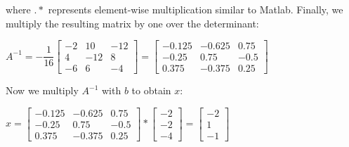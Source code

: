 \documentclass{article}
\newcommand{\1}{\mathbf{1}}
\begin{document}
\begin{enumerate}
\begin{center}
	\end{center}
	where $.*$ represents element-wise multiplication similar to Matlab. Finally, we multiply the resulting matrix by one over the determinant:
	\begin{center}
		$A^{-1}=- \dfrac{1}{16}\begin{bmatrix}-2&10&-12 \\ 4&-12&8 \\ -6&6&-4 \end{bmatrix}= \begin{bmatrix}-0.125&-0.625&0.75 \\ -0.25&0.75&-0.5 \\ 0.375&-0.375&0.25 \end{bmatrix}$
	\end{center}
	Now we multiply $A^{-1}$ with $b$ to obtain $x$:
	\begin{center}
		$x=\begin{bmatrix}-0.125&-0.625&0.75 \\ -0.25&0.75&-0.5 \\ 0.375&-0.375&0.25 \end{bmatrix}*\begin{bmatrix}-2\\-2\\-4 \end{bmatrix} =\begin{bmatrix}-2\\1\\-1 \end{bmatrix} $
	\end{center}
	
\end{enumerate}
\end{document}
